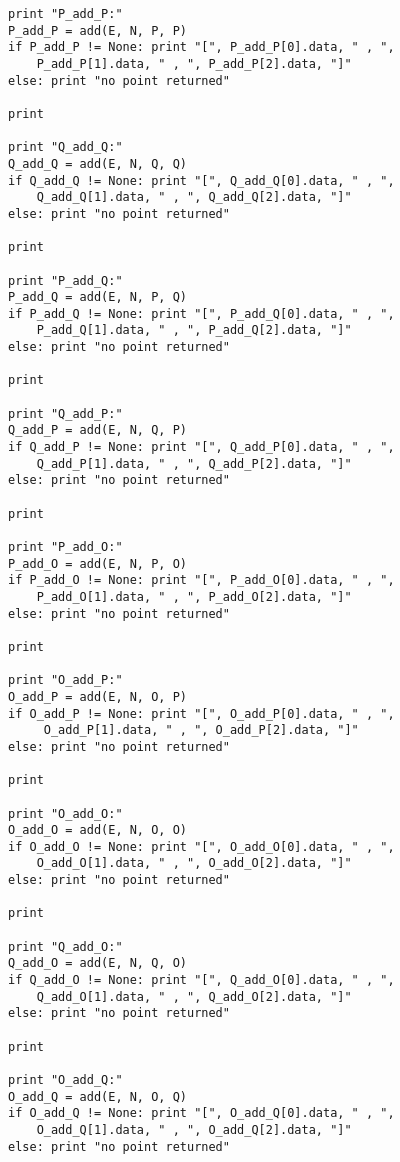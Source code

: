 \documentclass[a4paper,12pt]{article}
\begin{document}
\begin{Verbatim}[frame=single]
print "P_add_P:"
P_add_P = add(E, N, P, P)
if P_add_P != None: print "[", P_add_P[0].data, " , ", 
	P_add_P[1].data, " , ", P_add_P[2].data, "]"
else: print "no point returned"

print

print "Q_add_Q:"
Q_add_Q = add(E, N, Q, Q)
if Q_add_Q != None: print "[", Q_add_Q[0].data, " , ", 
	Q_add_Q[1].data, " , ", Q_add_Q[2].data, "]"
else: print "no point returned"

print

print "P_add_Q:"
P_add_Q = add(E, N, P, Q)
if P_add_Q != None: print "[", P_add_Q[0].data, " , ", 
	P_add_Q[1].data, " , ", P_add_Q[2].data, "]"
else: print "no point returned"

print

print "Q_add_P:"
Q_add_P = add(E, N, Q, P)
if Q_add_P != None: print "[", Q_add_P[0].data, " , ", 
	Q_add_P[1].data, " , ", Q_add_P[2].data, "]"
else: print "no point returned"

print

print "P_add_O:"
P_add_O = add(E, N, P, O)
if P_add_O != None: print "[", P_add_O[0].data, " , ", 
	P_add_O[1].data, " , ", P_add_O[2].data, "]"
else: print "no point returned"

print

print "O_add_P:"
O_add_P = add(E, N, O, P)
if O_add_P != None: print "[", O_add_P[0].data, " , ",
	 O_add_P[1].data, " , ", O_add_P[2].data, "]"
else: print "no point returned"

print

print "O_add_O:"
O_add_O = add(E, N, O, O)
if O_add_O != None: print "[", O_add_O[0].data, " , ", 
	O_add_O[1].data, " , ", O_add_O[2].data, "]"
else: print "no point returned"

print

print "Q_add_O:"
Q_add_O = add(E, N, Q, O)
if Q_add_O != None: print "[", Q_add_O[0].data, " , ", 
	Q_add_O[1].data, " , ", Q_add_O[2].data, "]"
else: print "no point returned"

print

print "O_add_Q:"
O_add_Q = add(E, N, O, Q)
if O_add_Q != None: print "[", O_add_Q[0].data, " , ", 
	O_add_Q[1].data, " , ", O_add_Q[2].data, "]"
else: print "no point returned"
\end{Verbatim}
\end{document}
